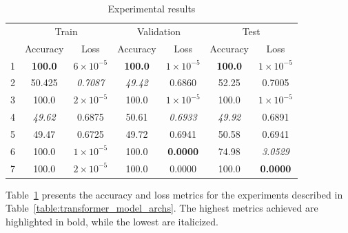 \begin{table}[h!]
\begin{tabular}{c||c|c||c|c||c|c}
    \toprule
  & \multicolumn{2}{c||}{Train} & \multicolumn{2}{c||}{Validation} & \multicolumn{2}{c}{Test} \\
  \cmidrule{2-7}
  & Accuracy & Loss & Accuracy & Loss & Accuracy & Loss \\
  \midrule
1 & \textbf{100.0} & $6\times10^{-5}$ & \textbf{100.0} & $1\times10^{-5}$ & \textbf{100.0} & $1\times10^{-5}$ \\
2 & 50.425 & \emph{0.7087} & \emph{49.42} & 0.6860 & 52.25 & 0.7005 \\
3 & 100.0 & $2\times10^{-5}$ & 100.0 & $1\times10^{-5}$ & 100.0 & $1\times10^{-5}$  \\
4 & \emph{49.62} & 0.6875 & 50.61 & \emph{0.6933} & \emph{49.92} & 0.6891  \\
5 & 49.47 & 0.6725 & 49.72 & 0.6941 & 50.58 & 0.6941 \\
6 & 100.0 & \boldmath$1\times10^{-5}$ & 100.0 & \textbf{0.0000} & 74.98 & \emph{3.0529}  \\
7 & 100.0 & $2\times10^{-5}$ & 100.0 & 0.0000 & 100.0 & \textbf{0.0000}  \\
\bottomrule
\end{tabular}
\caption{Experimental results}
\label{table:exp_results}
\end{table}

Table~\ref{table:exp_results} presents the accuracy and loss metrics for the experiments described in Table~\ref{table:transformer_model_archs}. The highest metrics achieved are highlighted in bold, while the lowest are italicized.


